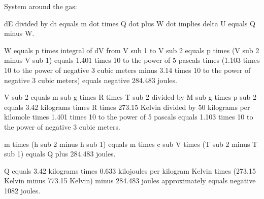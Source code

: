 System around the gas:  

dE divided by dt equals m dot times Q dot plus W dot implies delta U equals Q minus W.  

W equals p times integral of dV from V sub 1 to V sub 2 equals p times (V sub 2 minus V sub 1) equals 1.401 times 10 to the power of 5 pascals times (1.103 times 10 to the power of negative 3 cubic meters minus 3.14 times 10 to the power of negative 3 cubic meters) equals negative 284.483 joules.  

V sub 2 equals m sub g times R times T sub 2 divided by M sub g times p sub 2 equals 3.42 kilograms times R times 273.15 Kelvin divided by 50 kilograms per kilomole times 1.401 times 10 to the power of 5 pascals equals 1.103 times 10 to the power of negative 3 cubic meters.  

m times (h sub 2 minus h sub 1) equals m times c sub V times (T sub 2 minus T sub 1) equals Q plus 284.483 joules.  

Q equals 3.42 kilograms times 0.633 kilojoules per kilogram Kelvin times (273.15 Kelvin minus 773.15 Kelvin) minus 284.483 joules approximately equals negative 1082 joules.